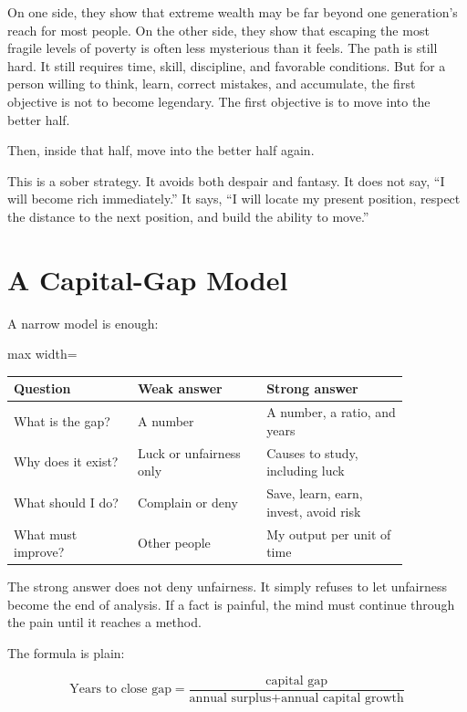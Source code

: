 On one side, they show that extreme wealth may be far beyond one generation's reach for most people. On the other side, they show that escaping the most fragile levels of poverty is often less mysterious than it feels. The path is still hard. It still requires time, skill, discipline, and favorable conditions. But for a person willing to think, learn, correct mistakes, and accumulate, the first objective is not to become legendary. The first objective is to move into the better half.

Then, inside that half, move into the better half again.

This is a sober strategy. It avoids both despair and fantasy. It does not say, ``I will become rich immediately.'' It says, ``I will locate my present position, respect the distance to the next position, and build the ability to move.''

\section*{A Capital-Gap Model}

A narrow model is enough:

\begin{center}
\begin{adjustbox}{max width=\linewidth}
\begin{tabular}{p{0.27\linewidth}p{0.28\linewidth}p{0.31\linewidth}}
\hline
Question & Weak answer & Strong answer \\
\hline
What is the gap? & A number & A number, a ratio, and years \\
Why does it exist? & Luck or unfairness only & Causes to study, including luck \\
What should I do? & Complain or deny & Save, learn, earn, invest, avoid risk \\
What must improve? & Other people & My output per unit of time \\
\hline
\end{tabular}
\end{adjustbox}
\end{center}

The strong answer does not deny unfairness. It simply refuses to let unfairness become the end of analysis. If a fact is painful, the mind must continue through the pain until it reaches a method.

The formula is plain:

\[
\text{Years to close gap}
=
\frac{\text{capital gap}}{\text{annual surplus}+\text{annual capital growth}}
\]

